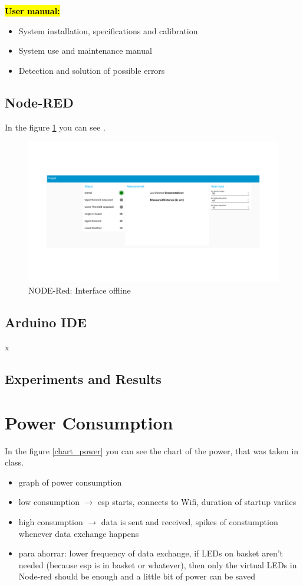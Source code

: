\documentclass{article}
\begin{document}
\textcolor{red}{\textbf{\hl{User manual:}}}
\begin{itemize}
	\item System installation, specifications and calibration
	\item System use and maintenance manual
	\item Detection and solution of possible errors
\end{itemize}

\subsection{Node-RED}

In the figure \ref{inteface_offline} you can see .

\begin{figure}[]
	\centering
	\includegraphics[scale=0.2]{images/interface_offline_2.png}
	\caption{NODE-Red: Interface offline}	
	\label{inteface_offline}
\end{figure}
\subsection{Arduino IDE}
x

\subsection{Experiments and Results}
\section{Power Consumption}

In the figure \ref{chart_power} you can see the chart of the power, that was taken in class.

\begin{itemize}	
\item graph of power consumption
\item low consumption $\to$ esp starts, connects to Wifi, duration of startup variies
\item high consumption $\to$ data is sent and received, spikes of constumption whenever data exchange happens
\item para ahorrar: lower frequency of data exchange, if LEDs on basket aren't needed (because esp is in basket or whatever), then only the virtual LEDs in Node-red should be enough and a little bit of power can be saved
\end{itemize}
\end{document}

